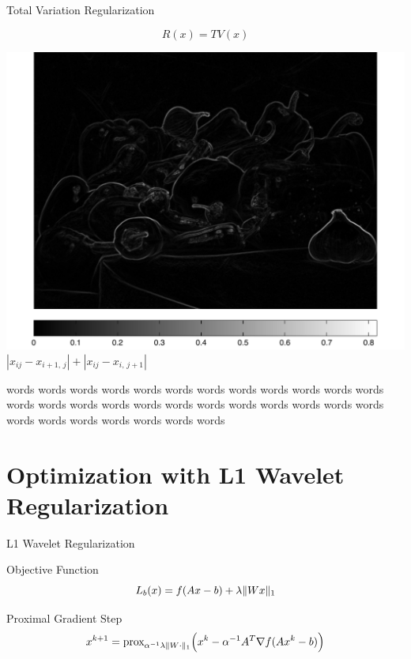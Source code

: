 \documentclass[12pt]{beamer}
\newcommand{\prox}{\text{prox}}
\begin{document}
\begin{frame}{Total Variation Regularization}

\vspace{-4ex}
\[ R(x) = TV(x) \]

\vspace{2ex}
\begin{minipage}[T]{0.45\textwidth}
	\begin{center}
	\includegraphics[width=1\textwidth]{../figures/diff.pdf} \\
	$|x_{ij} - x_{i+1,\,j}| + |x_{ij}-x_{i,\,j+1}|$
	\end{center}
\end{minipage}
\begin{minipage}[T]{0.5\textwidth}
words words words words words words words words words words words words words words words words words words words words words words words words words words words words words words words \\[4ex]
\end{minipage}

\end{frame}


\section{Optimization with L1 Wavelet Regularization}

\begin{frame}{L1 Wavelet Regularization}
\begin{block}{Objective Function}
\[ L_b(x) = f(Ax-b) + \lambda \| Wx \|_1 \vspace{1ex} \]
\end{block}

\vspace{2ex}
\begin{block}{Proximal Gradient Step}
\[ x^{k+1} = \prox_{\alpha^{-1}\lambda \| W \cdot \|_1} \Big(x^k - \alpha^{-1} A^T\nabla f (Ax^k - b)\Big) \vspace{1ex} \]
\end{block}
\end{frame}
\end{document}
